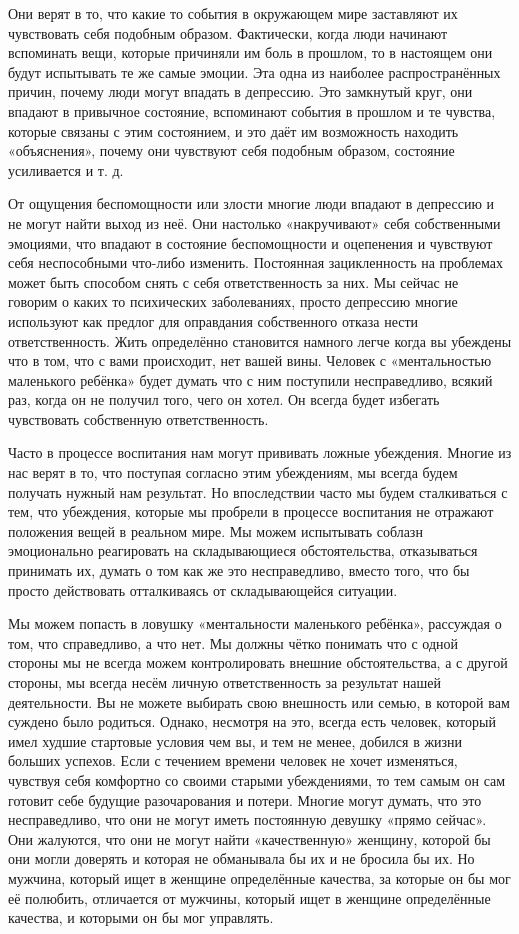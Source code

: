 Они верят в то, что какие то события в окружающем мире заставляют их чувствовать себя подобным образом. Фактически, когда люди начинают вспоминать вещи, которые причиняли им боль в прошлом, то в настоящем они будут испытывать те же самые эмоции. Эта одна из наиболее распространённых причин, почему люди могут впадать в депрессию. Это замкнутый круг, они впадают в привычное состояние, вспоминают события в прошлом и те чувства, которые связаны с этим состоянием, и это даёт им возможность находить «объяснения», почему они чувствуют себя подобным образом, состояние усиливается и т. д.

От ощущения беспомощности или злости многие люди впадают в депрессию и не могут найти выход из неё. Они настолько «накручивают» себя собственными эмоциями, что впадают в состояние беспомощности и оцепенения и чувствуют себя неспособными что-либо изменить. Постоянная зацикленность на проблемах может быть способом снять с себя ответственность за них. Мы сейчас не говорим о каких то психических заболеваниях, просто депрессию многие используют как предлог для оправдания собственного отказа нести ответственность. Жить определённо становится намного легче когда вы убеждены что в том, что с вами происходит, нет вашей вины. Человек с «ментальностью маленького ребёнка» будет думать что с ним поступили несправедливо, всякий раз, когда он не получил того, чего он хотел. Он всегда будет избегать чувствовать собственную ответственность.

Часто в процессе воспитания нам могут прививать ложные убеждения. Многие из нас верят в то, что поступая согласно этим убеждениям, мы всегда будем получать нужный нам результат. Но впоследствии часто мы будем сталкиваться с тем, что убеждения, которые мы пробрели в процессе воспитания не отражают положения вещей в реальном мире. Мы можем испытывать соблазн эмоционально реагировать на складывающиеся обстоятельства, отказываться принимать их, думать о том как же это несправедливо, вместо того, что бы просто действовать отталкиваясь от складывающейся ситуации.

Мы можем попасть в ловушку «ментальности маленького ребёнка», рассуждая о том, что справедливо, а что нет. Мы должны чётко понимать что с одной стороны мы не всегда можем контролировать внешние обстоятельства, а с другой стороны, мы всегда несём личную ответственность за результат нашей деятельности. Вы не можете выбирать свою внешность или семью, в которой вам суждено было родиться. Однако, несмотря на это, всегда есть человек, который имел худшие стартовые условия чем вы, и тем не менее, добился в жизни больших успехов. Если с течением времени человек не хочет изменяться, чувствуя себя комфортно со своими старыми убеждениями, то тем самым он сам готовит себе будущие разочарования и потери. Многие могут думать, что это несправедливо, что они не могут иметь постоянную девушку «прямо сейчас». Они жалуются, что они не могут найти «качественную» женщину, которой бы они могли доверять и которая не обманывала бы их и не бросила бы их. Но мужчина, который ищет в женщине определённые качества, за которые он бы мог её полюбить, отличается от мужчины, который ищет в женщине определённые качества, и которыми он бы мог управлять.

